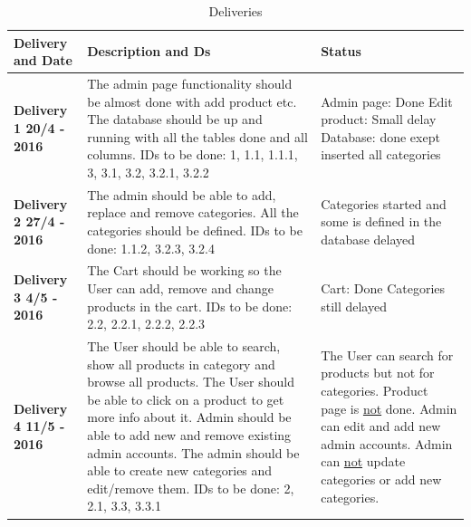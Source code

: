 \documentclass[a4paper,12pt]{article}
\begin{document}
\begin{table}[htbp]
	\centering
	\caption{Deliveries}
	\label{my-label}
	\begin{tabular}{|L{4cm}|L{7cm}|L{4cm}|}
		\hline
		\textbf{Delivery and Date}& \textbf{Description and Ds}                                                                                                                                                                                                                                                                                   & \textbf{Status} \\ \hline
		\textbf{Delivery 1  20/4 - 2016} & The admin page functionality should be almost done with add product etc. \newline The database should be up and running with all the tables done and all columns. \newline IDs to be done: 1, 1.1, 1.1.1, 3, 3.1, 3.2, 3.2.1, 3.2.2                                                                   &     Admin page: Done \newline Edit product: Small delay \newline Database: done exept inserted all categories            \\ \hline
		\textbf{Delivery 2 27/4 - 2016} & The admin should be able to add, replace and remove categories. \newline All the categories should be defined. \newline IDs to be done: 1.1.2, 3.2.3, 3.2.4                                                                                                                                            &  Categories started and some is defined in the database  delayed           \\ \hline
		\textbf{Delivery 3 4/5 - 2016}  & The Cart should be working so the User can add, remove and change products in the cart. \newline IDs to be done: 2.2, 2.2.1, 2.2.2, 2.2.3                                                                                                                                                      &  Cart: Done \newline Categories still delayed                \\ \hline
		\textbf{Delivery 4 11/5 - 2016} & The User should be able to search, show all products in category and browse all products. \newline The User should be able to click on a product to get more info about it. \newline Admin should be able to add new and remove existing admin accounts. \newline The admin should be able to create new categories and edit/remove them. \newline IDs to be done: 2, 2.1, 3.3, 3.3.1          &  The User can search for products but not for categories. \newline Product page is \underline{not} done. \newline Admin can edit and add new admin accounts. \newline Admin can \underline{not} update categories or add new categories.              \\ \hline

\end{tabular}
\end{table}
\end{document}
